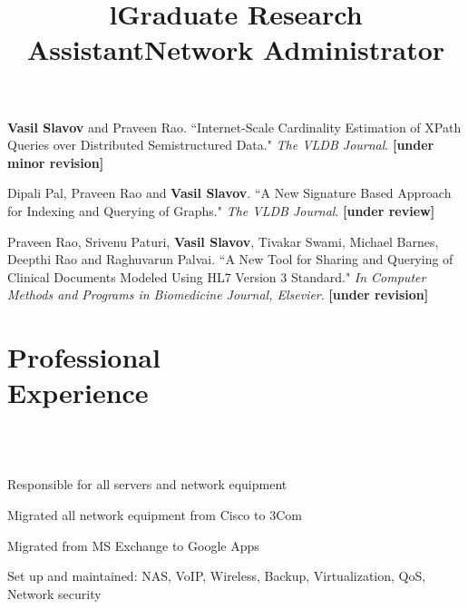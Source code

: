 \documentclass[margin,line]{resume}
\begin{document}
\begin{resume}
\vspace{-2mm}
    \textbf{Vasil Slavov} and Praveen Rao.
    ``Internet-Scale Cardinality Estimation of XPath Queries over Distributed Semistructured Data."
    \textsl{The VLDB Journal}. \textbf{[under minor revision]}

\vspace{-2mm}
    Dipali Pal, Praveen Rao and \textbf{Vasil Slavov}.
    ``A New Signature Based Approach for Indexing and Querying of Graphs."
    \textsl{The VLDB Journal}. \textbf{[under review]}
    
\vspace{-2mm}
    Praveen Rao, Srivenu Paturi, \textbf{Vasil Slavov}, Tivakar Swami, Michael Barnes, Deepthi Rao and Raghuvarun Palvai.
    ``A New Tool for Sharing and Querying of Clinical Documents Modeled Using HL7 Version 3 Standard."
    \textsl{In Computer Methods and Programs in Biomedicine Journal, Elsevier}. \textbf{[under revision]}
    
    \section{\mysidestyle Professional\\Experience}
    
    \begin{format}
    \title{l}\\
    \\
    \end{format}

    \title{\textbf{Graduate Research Assistant}}
    \begin{position}\end{position}
    
    \title{\textbf{Network Administrator}}
    \begin{position}
    \vspace{-2mm}
    \begin{list2}
    \item Responsible for all servers and network equipment
    \item Migrated all network equipment from Cisco to 3Com
    \item Migrated from MS Exchange to Google Apps
    \item Set up and maintained: NAS, VoIP, Wireless, Backup, Virtualization, QoS, Network security
    \end{list2}
    \end{position}


\end{resume}
\end{document}

